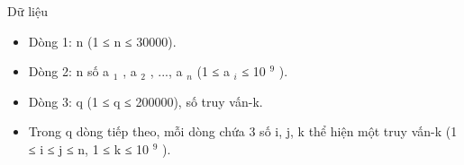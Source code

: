 Dữ liệu
\begin{itemize}
	\item     Dòng 1: n (1 ≤ n ≤ 30000).   
	\item     Dòng 2: n số a    $_     1    $    , a    $_     2    $    , ...,   a    $_     n    $    (1 ≤ a    $_     i    $    ≤   10    $^     9    $    ).   
	\item     Dòng 3: q (1 ≤ q ≤ 200000), số truy vấn-k.   
	\item     Trong q dòng tiếp theo, mỗi dòng chứa 3 số i, j, k   thể hiện một truy vấn-k (1 ≤ i ≤ j ≤ n, 1 ≤ k ≤   10    $^     9    $    ).   
\end{itemize}